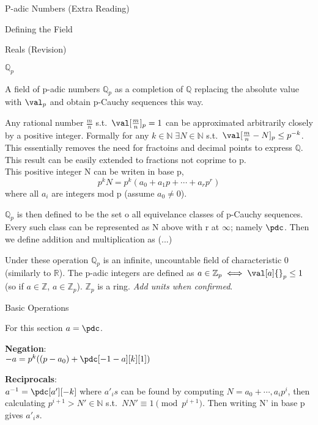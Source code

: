 \documentclass[12pt, letterpaper]{article}
\newcommand{\R}{\mathbb{R}}
\newcommand{\Q}{\mathbb{Q}}
\newcommand{\Z}{\mathbb{Z}}
\newcommand{\N}{\mathbb{N}}
\begin{document}
\begin{section}{P-adic Numbers (Extra Reading)}
\begin{subsection}{Defining the Field}
\begin{subsubsection}{Reals (Revision)}
    \end{subsubsection}

    \begin{subsubsection}{\(\Q_{p}\)}

      A field of p-adic numbers \(\Q_{p}\) as a completion of \(\Q\) replacing
      the absolute value with \(\val_{p}\) and obtain p-Cauchy sequences this
      way.

      Any rational number \(\frac{m}{n}\) s.t.\ \(\val[\frac{m}{n}]{}_{p} = 1\)
      can be approximated arbitrarily closely by a positive integer. Formally
      for any \(k \in \N \; \exists N \in \N\) s.t.\ \(\val[\frac{m}{n} - N]{}
      _{p} \leq p^{-k}\). This essentially removes the need for fractoins and
      decimal points to express \(\Q\). This result can be easily extended to
      fractions not coprime to p. \\
      This positive integer N can be writen in base p, \[p^{k}N = p^{k}
        (a_{0} + a_{1} p + \cdots + a_{r} p^{r})\] where all \(a_{i}\) are
      integers mod p (assume \(a_{0} \neq 0\)).

      \(\Q_{p}\) is then defined to be the set o all equivelance classes of
      p-Cauchy sequences. Every such class can be represented as N above with
      r at \(\infty\); namely \(\pdc\). Then we define addition and
      multiplication as (...)

      Under these operation \(\Q_{p}\) is an infinite, uncountable field of
      characteristic 0 (similarly to \(\R\)). The p-adic integers are defined
      as \(a \in \Z_{p} \iff \val[a]{}_{p} \leq 1\) (so if \(a \in \Z\),
      \(a \in \Z_{p}\)). \(\Z_{p}\) is a ring.
      \textit{Add units when confirmed}.

    \end{subsubsection}

    \begin{subsubsection}{Basic Operations}

      For this section \(a = \pdc\).

      \textbf{Negation}: \\
      \(-a = p^{k}((p - a_{0}) + \pdc[-1 - a][k][1])\)

      \textbf{Reciprocals}: \\
      \(a^{-1} = \pdc[a'][-k]\) where \(a'_{i}s\) can be found by computing
      \(N = a_{0} + \cdots , a_{i} p^{i}\), then calculating \(p^{i + 1} > N'
      \in \N\) s.t.\ \(NN' \equiv 1 \pmod{p^{i + 1}}\). Then writing N' in base
      p gives \(a'_{i}s\).


\end{subsubsection}
\end{subsection}
\end{section}
\end{document}
